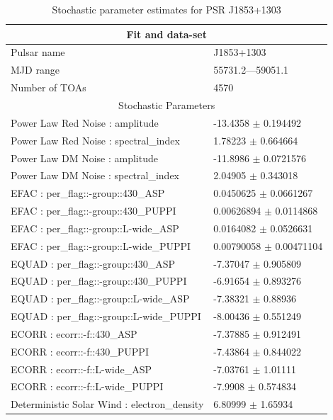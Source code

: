 \documentclass{article}
\begin{document}
\begin{table}
\caption{Stochastic parameter estimates for PSR J1853+1303}
\begin{tabular}{ll}
\hline\hline
\multicolumn{2}{c}{Fit and data-set} \\ 
\hline
Pulsar name\dotfill & J1853+1303 \\ 
MJD range\dotfill & 55731.2---59051.1 \\ 
Number of TOAs\dotfill & 4570 \\
\hline
\multicolumn{2}{c}{Stochastic Parameters} \\ 
\hline
Power Law Red Noise : amplitude \dotfill & -13.4358 $\pm$ 0.194492  \\ 
Power Law Red Noise : spectral_index \dotfill & 1.78223 $\pm$ 0.664664  \\ 
Power Law DM Noise : amplitude \dotfill & -11.8986 $\pm$ 0.0721576  \\ 
Power Law DM Noise : spectral_index \dotfill & 2.04905 $\pm$ 0.343018  \\ 
EFAC : per_flag::-group::430_ASP \dotfill & 0.0450625 $\pm$ 0.0661267  \\ 
EFAC : per_flag::-group::430_PUPPI \dotfill & 0.00626894 $\pm$ 0.0114868  \\ 
EFAC : per_flag::-group::L-wide_ASP \dotfill & 0.0164082 $\pm$ 0.0526631  \\ 
EFAC : per_flag::-group::L-wide_PUPPI \dotfill & 0.00790058 $\pm$ 0.00471104  \\ 
EQUAD : per_flag::-group::430_ASP \dotfill & -7.37047 $\pm$ 0.905809  \\ 
EQUAD : per_flag::-group::430_PUPPI \dotfill & -6.91654 $\pm$ 0.893276  \\ 
EQUAD : per_flag::-group::L-wide_ASP \dotfill & -7.38321 $\pm$ 0.88936  \\ 
EQUAD : per_flag::-group::L-wide_PUPPI \dotfill & -8.00436 $\pm$ 0.551249  \\ 
ECORR : ecorr::-f::430_ASP \dotfill & -7.37885 $\pm$ 0.912491  \\ 
ECORR : ecorr::-f::430_PUPPI \dotfill & -7.43864 $\pm$ 0.844022  \\ 
ECORR : ecorr::-f::L-wide_ASP \dotfill & -7.03761 $\pm$ 1.01111  \\ 
ECORR : ecorr::-f::L-wide_PUPPI \dotfill & -7.9908 $\pm$ 0.574834  \\ 
Deterministic Solar Wind : electron_density \dotfill & 6.80999 $\pm$ 1.65934  \\ 
\hline
\end{tabular}
\label{Table:J1853+1303}
\end{table} 
\end{document}
